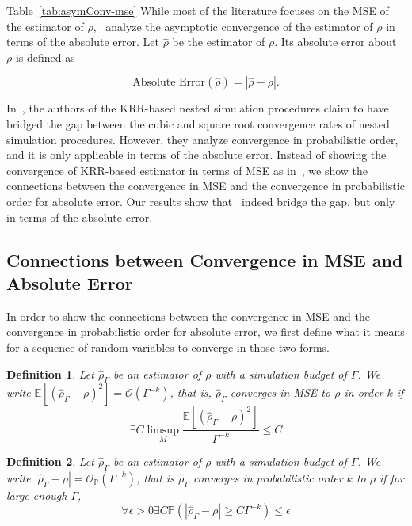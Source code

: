 \documentclass{article}
\newtheorem{definition}{Definition}
\begin{document}
Table~\ref{tab:asymConv-mse}
While most of the literature focuses on the MSE of the estimator of $\rho$,~\cite{wang2022smooth} analyze the asymptotic convergence of the estimator of $\rho$ in terms of the absolute error.
Let $\hat{\rho}$ be the estimator of $\rho$. Its absolute error about $\rho$ is defined as

$$
\mbox{Absolute Error}\left(\hat{\rho}\right) = \left| \hat{\rho} - \rho \right|.
$$

In~\cite{wang2022smooth}, the authors of the KRR-based nested simulation procedures claim to have bridged the gap between the cubic and square root convergence rates of nested simulation procedures. However, they analyze convergence in probabilistic order, and it is only applicable in terms of the absolute error. 
Instead of showing the convergence of KRR-based estimator in terms of MSE as in~\cite{gordy2010nested}, we show the connections between the convergence in MSE and the convergence in probabilistic order for absolute error.
Our results show that~\cite{wang2022smooth} indeed bridge the gap, but only in terms of the absolute error.

\subsection{Connections between Convergence in MSE and Absolute Error} \label{sec:connection-mse-absolute-error}

In order to show the connections between the convergence in MSE and the convergence in probabilistic order for absolute error, we first define what it means for a sequence of random variables to converge in those two forms.

\begin{definition}
    Let $\hat{\rho}_{\Gamma}$ be an estimator of $\rho$ with a simulation budget of $\Gamma$. 
    We write $\mathbb{E} \left[ \left(\hat{\rho}_{\Gamma} - \rho\right)^2 \right] = \mathcal{O} \left( \Gamma^{-k} \right)$, that is, $\hat{\rho}_{\Gamma}$ converges in MSE to $\rho$ in order $k$ if 
    $$
        \exists C \limsup_{M} \frac{\mathbb{E} \left[\left(\hat{\rho}_{\Gamma} - \rho\right)^2 \right]}{\Gamma^{-k}} \leq C
    $$
\end{definition}

\begin{definition}
    Let $\hat{\rho}_{\Gamma}$ be an estimator of $\rho$ with a simulation budget of $\Gamma$. 
    We write $|\hat{\rho}_{\Gamma} - \rho| = \mathcal{O}_{\mathbb{P}}(\Gamma^{-k})$, that is $\hat{\rho}_{\Gamma}$ converges in probabilistic order $k$ to $\rho$ if for large enough $\Gamma$,
    $$
        \forall \epsilon > 0 \exists C \mathbb{P} \left( \left| \hat{\rho}_{\Gamma} - \rho \right| \geq C \Gamma^{-k} \right) \leq \epsilon 
    $$
\end{definition}
\end{document}
